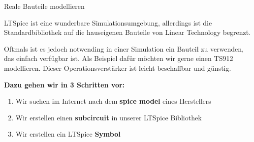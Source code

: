 \begin{frame}[t]{Reale Bauteile modellieren}

    LTSpice ist eine wunderbare Simulationsumgebung, allerdings ist die Standardbibliothek
    auf die hauseigenen Bauteile von Linear Technology begrenzt.

    Oftmals ist es jedoch notwending in einer Simulation ein Bauteil zu verwenden,
    das einfach verfügbar ist. Als Beispiel dafür möchten wir gerne einen TS912 modellieren.
    Dieser Operationsverstärker ist leicht beschaffbar und günstig.

    \textbf{Dazu gehen wir in 3 Schritten vor:}

    \begin{enumerate}
        \item Wir suchen im Internet nach dem \textbf{spice model} eines Herstellers
        \item Wir erstellen einen \textbf{subcircuit} in unserer LTSpice Bibliothek
        \item Wir erstellen ein LTSpice \textbf{Symbol}
    \end{enumerate}
\end{frame}

